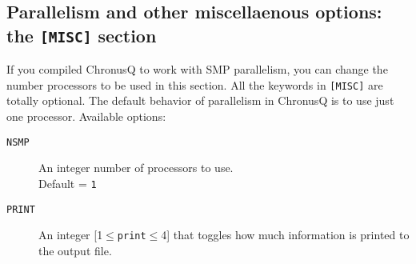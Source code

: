 \documentclass[12pt]{article}
\begin{document}
    \subsection{Parallelism and other miscellaenous options: the \texttt{[MISC]} section}
     If you compiled ChronusQ to work with SMP parallelism, you can change the number processors to be used in this section. All the keywords in \texttt{[MISC]} are totally optional. The default behavior of parallelism in ChronusQ is to use just one processor.
     Available options:
     \begin{description}
     \item[\texttt{NSMP}] An integer number of processors to use. \\
     Default = \texttt{1}
     \item[\texttt{PRINT}] An integer [1$\leq$\texttt{print}$\leq$4] that toggles how much information is printed to the output file.
     \end{description}
\end{document}
